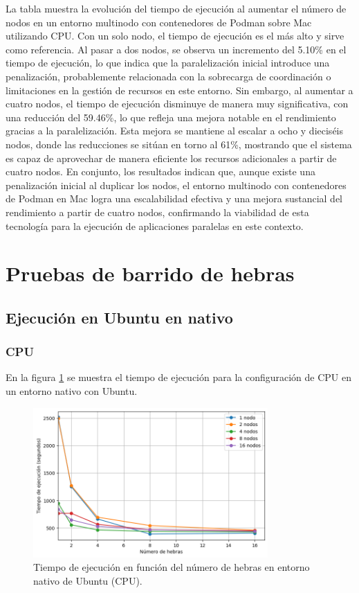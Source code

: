 La tabla muestra la evolución del tiempo de ejecución al aumentar el número de nodos en un entorno multinodo con contenedores de Podman sobre Mac utilizando CPU. Con un solo nodo, el tiempo de ejecución es el más alto y sirve como referencia. Al pasar a dos nodos, se observa un incremento del 5.10\% en el tiempo de ejecución, lo que indica que la paralelización inicial introduce una penalización, probablemente relacionada con la sobrecarga de coordinación o limitaciones en la gestión de recursos en este entorno. Sin embargo, al aumentar a cuatro nodos, el tiempo de ejecución disminuye de manera muy significativa, con una reducción del 59.46\%, lo que refleja una mejora notable en el rendimiento gracias a la paralelización. Esta mejora se mantiene al escalar a ocho y dieciséis nodos, donde las reducciones se sitúan en torno al 61\%, mostrando que el sistema es capaz de aprovechar de manera eficiente los recursos adicionales a partir de cuatro nodos. En conjunto, los resultados indican que, aunque existe una penalización inicial al duplicar los nodos, el entorno multinodo con contenedores de Podman en Mac logra una escalabilidad efectiva y una mejora sustancial del rendimiento a partir de cuatro nodos, confirmando la viabilidad de esta tecnología para la ejecución de aplicaciones paralelas en este contexto.

\section{Pruebas de barrido de hebras}
\subsection{Ejecución en Ubuntu en nativo}
\subsubsection{CPU}

En la figura \ref{fig:thread_sweep_ubuntu_cpu_native_time} se muestra el tiempo de ejecución para la configuración de CPU en un entorno nativo con Ubuntu.

\begin{figure}[H]
    \centering
    \includegraphics[width=0.8\textwidth]{imagenes/cap5/thread_sweep_ubuntu_cpu_native_time.png}
    \caption{Tiempo de ejecución en función del número de hebras en entorno nativo de Ubuntu (CPU).}
    \label{fig:thread_sweep_ubuntu_cpu_native_time}
\end{figure}

